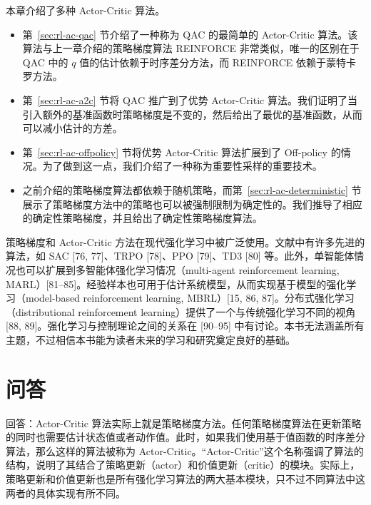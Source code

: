 本章介绍了多种 Actor-Critic 算法。
\begin{itemize}
  \item 第~\ref{sec:rl-ac-qac} 节介绍了一种称为 QAC 的最简单的 Actor-Critic 算法。该算法与上一章介绍的策略梯度算法 REINFORCE 非常类似，唯一的区别在于 QAC 中的 $q$ 值的估计依赖于时序差分方法，而 REINFORCE 依赖于蒙特卡罗方法。
  \item 第~\ref{sec:rl-ac-a2c} 节将 QAC 推广到了优势 Actor-Critic 算法。我们证明了当引入额外的基准函数时策略梯度是不变的，然后给出了最优的基准函数，从而可以减小估计的方差。
  \item 第~\ref{sec:rl-ac-offpolicy} 节将优势 Actor-Critic 算法扩展到了 Off-policy 的情况。为了做到这一点，我们介绍了一种称为重要性采样的重要技术。
  \item 之前介绍的策略梯度算法都依赖于随机策略，而第~\ref{sec:rl-ac-deterministic} 节展示了策略梯度方法中的策略也可以被强制限制为确定性的。我们推导了相应的确定性策略梯度，并且给出了确定性策略梯度算法。
\end{itemize}

策略梯度和 Actor-Critic 方法在现代强化学习中被广泛使用。文献中有许多先进的算法，如 SAC [76, 77]、TRPO [78]、PPO [79]、TD3 [80] 等。此外，单智能体情况也可以扩展到多智能体强化学习情况（multi-agent reinforcement learning, MARL）[81--85]。经验样本也可用于估计系统模型，从而实现基于模型的强化学习（model-based reinforcement learning, MBRL）[15, 86, 87]。分布式强化学习（distributional reinforcement learning）提供了一个与传统强化学习不同的视角 [88, 89]。强化学习与控制理论之间的关系在 [90--95] 中有讨论。本书无法涵盖所有主题，不过相信本书能为读者未来的学习和研究奠定良好的基础。

\section{问答}
\label{sec:rl-ac-qa}

\begin{note}
回答：Actor-Critic 算法实际上就是策略梯度方法。任何策略梯度算法在更新策略的同时也需要估计状态值或者动作值。此时，如果我们使用基于值函数的时序差分算法，那么这样的算法被称为 Actor-Critic。“Actor-Critic”这个名称强调了算法的结构，说明了其结合了策略更新（actor）和价值更新（critic）的模块。实际上，策略更新和价值更新也是所有强化学习算法的两大基本模块，只不过不同算法中这两者的具体实现有所不同。
\end{note}

